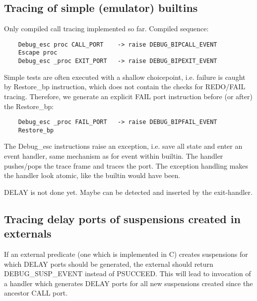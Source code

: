 \subsection{Tracing of simple (emulator) builtins}

Only compiled call tracing implemented so far. Compiled sequence:
\begin{verbatim}
	Debug_esc proc CALL_PORT	-> raise DEBUG_BIPCALL_EVENT
	Escape proc
	Debug_esc _proc EXIT_PORT	-> raise DEBUG_BIPEXIT_EVENT
\end{verbatim}
Simple tests are often executed with a shallow choicepoint, i.e. failure
is caught by Restore_bp instruction, which does not contain the checks
for REDO/FAIL tracing. Therefore, we generate an explicit FAIL port
instruction before (or after) the Restore_bp:
\begin{verbatim}
	Debug_esc _proc FAIL_PORT	-> raise DEBUG_BIPFAIL_EVENT
	Restore_bp
\end{verbatim}
The Debug_esc instructions raise an exception, i.e. save all state and
enter an event handler, same mechanism as for event within builtin.
The handler pushes/pops the trace frame and traces the port. The exception
handling makes the handler look atomic, like the builtin would have been.

DELAY is not done yet. Maybe can be detected and inserted by the exit-handler.


\subsection{Tracing delay ports of suspensions created in externals}

If an external predicate (one which is implemented in C) creates suspensions
for which DELAY ports should be generated, the external should return
DEBUG_SUSP_EVENT instead of PSUCCEED. This will lead to invocation of
a handler which generates DELAY ports for all new suspensions created
since the ancestor CALL port.


